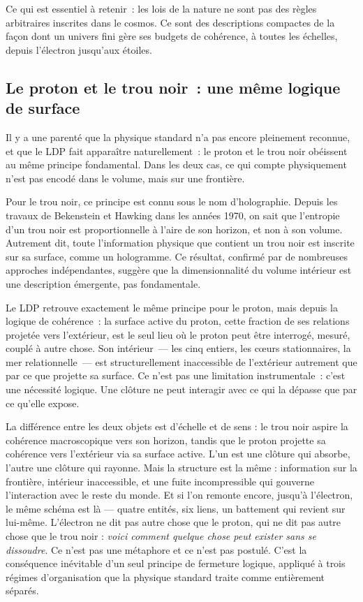 \documentclass[12pt, a4paper, openright]{book}
\begin{document}
\medskip

Ce qui est essentiel à retenir~: les lois de la nature ne sont pas des règles arbitraires inscrites dans le cosmos. Ce sont des descriptions compactes de la façon dont un univers fini gère ses budgets de cohérence, à toutes les échelles, depuis l'électron jusqu'aux étoiles.

\subsection*{Le proton et le trou noir~: une même logique de surface}

Il y a une parenté que la physique standard n'a pas encore pleinement reconnue, et que le LDP fait apparaître naturellement~: le proton et le trou noir obéissent au même principe fondamental. Dans les deux cas, ce qui compte physiquement n'est pas encodé dans le volume, mais sur une frontière.

\medskip

\medskip

Pour le trou noir, ce principe est connu sous le nom d'holographie. Depuis les travaux de Bekenstein et Hawking dans les années 1970, on sait que l'entropie d'un trou noir est proportionnelle à l'aire de son horizon, et non à son volume. Autrement dit, toute l'information physique que contient un trou noir est inscrite sur sa surface, comme un hologramme. Ce résultat, confirmé par de nombreuses approches indépendantes, suggère que la dimensionnalité du volume intérieur est une description émergente, pas fondamentale.

\medskip

Le LDP retrouve exactement le même principe pour le proton, mais depuis la logique de cohérence~: la surface active du proton, cette fraction de ses relations projetée vers l'extérieur, est le seul lieu où le proton peut être interrogé, mesuré, couplé à autre chose. Son intérieur~--- les cinq entiers, les c\oe{}urs stationnaires, la mer relationnelle~--- est structurellement inaccessible de l'extérieur autrement que par ce que projette sa surface. Ce n'est pas une limitation instrumentale~: c'est une nécessité logique. Une clôture ne peut interagir avec ce qui la dépasse que par ce qu'elle expose.

\medskip

La différence entre les deux objets est d'échelle et de sens : le trou noir aspire la cohérence macroscopique vers son horizon, tandis que le proton projette sa cohérence vers l'extérieur via sa surface active. L'un est une clôture qui absorbe, l'autre une clôture qui rayonne. Mais la structure est la même : information sur la frontière, intérieur inaccessible, et une fuite incompressible qui gouverne l'interaction avec le reste du monde. Et si l'on remonte encore, jusqu'à l'électron, le même schéma est là --- quatre entités, six liens, un battement qui revient sur lui-même. L'électron ne dit pas autre chose que le proton, qui ne dit pas autre chose que le trou noir : \emph{voici comment quelque chose peut exister sans se dissoudre}. Ce n'est pas une métaphore et ce n'est pas postulé. C'est la conséquence inévitable d'un seul principe de fermeture logique, appliqué à trois régimes d'organisation que la physique standard traite comme entièrement séparés.
\end{document}
